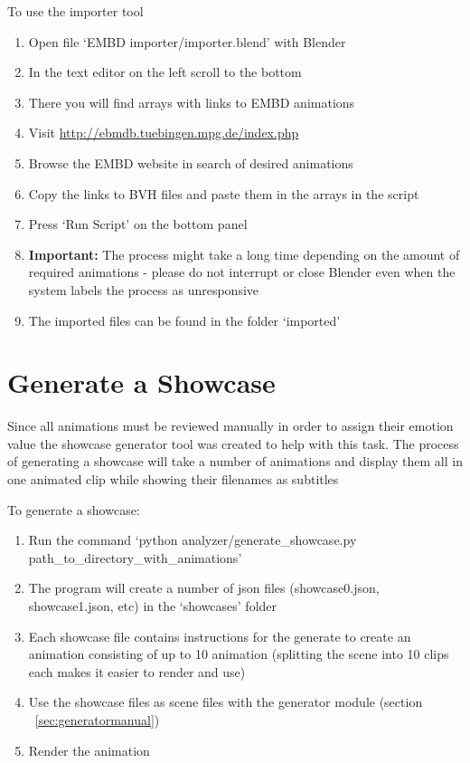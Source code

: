 \noindent To use the importer tool
\begin{enumerate}
	\item Open file `EMBD importer/importer.blend' with Blender
	\item In the text editor on the left scroll to the bottom
	\item There you will find arrays with links to EMBD animations
	\item Visit \url{http://ebmdb.tuebingen.mpg.de/index.php}
	\item Browse the EMBD website in search of desired animations
	\item Copy the links to BVH files and paste them in the arrays in the script
	\item Press `Run Script' on the bottom panel
	\item \textbf{Important:} The process might take a long time depending on the amount of required animations - please do not interrupt or close Blender even when the system labels the process as unresponsive
	\item The imported files can be found in the folder `imported'
\end{enumerate}


\section{Generate a Showcase \label{sec:showcasegeneratormanual}}
Since all animations must be reviewed manually in order to assign their emotion value the showcase generator tool was created to help with this task. The process of generating a showcase will take a number of animations and display them all in one animated clip while showing their filenames as subtitles

\noindent To generate a showcase:
\begin{enumerate}
	\item Run the command `python analyzer/generate\_showcase.py path\_to\_directory\_with\_animations'
	\item The program will create a number of json files (showcase0.json, showcase1.json, etc) in the `showcases' folder
	\item Each showcase file contains instructions for the generate to create an animation consisting of up to 10 animation (splitting the scene into 10 clips each makes it easier to render and use)
	\item Use the showcase files as scene files with the generator module (section ~\ref{sec:generatormanual})
	\item Render the animation
\end{enumerate}


